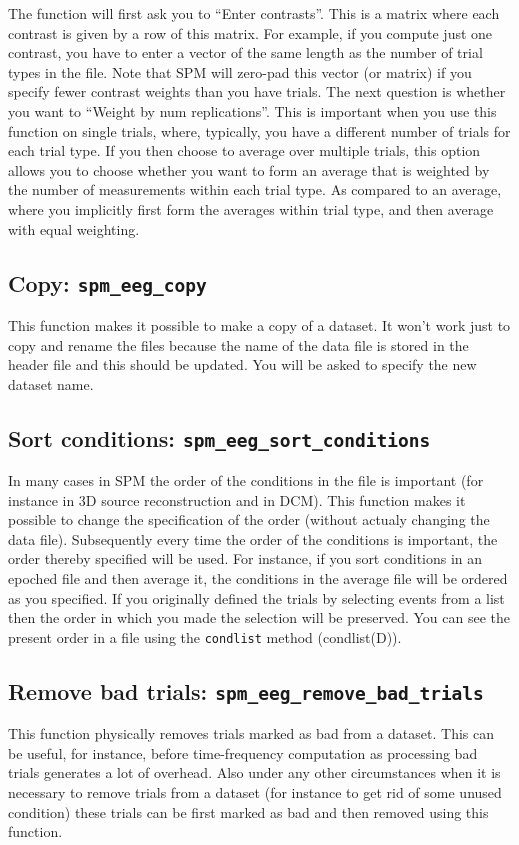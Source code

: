 The function will first ask you to ``Enter contrasts''. This is a matrix where each contrast is given by a row of this matrix. For example, if you compute just one contrast, you have to enter a vector of the same length as the number of trial types in the file. Note that SPM will zero-pad this vector  (or matrix) if you specify fewer contrast weights than you have trials.  The next question is whether you want to ``Weight by num replications''. This is important when you use this function on single trials, where, typically, you have a different number of trials for each trial type. If you then choose to average over multiple trials, this option allows you to choose whether you want to form an average that is weighted by the number of measurements within each trial type. As compared to an average, where you implicitly first form the averages within trial type, and then average with equal weighting.

\subsection{Copy: \texttt{spm\_eeg\_copy}}
This function makes it possible to make a copy of a dataset. It won't work just to copy and rename the files because the name of the data file is stored in the header file and this should be updated. You will be asked to specify the new dataset name.

\subsection{Sort conditions: \texttt{spm\_eeg\_sort\_conditions}}
In many cases in SPM the order of the conditions in the file is important (for instance in 3D source reconstruction and in DCM). This function makes it possible to change the specification of the order (without actualy changing the data file). Subsequently every time the order of the conditions is important, the order thereby specified will be used. For instance, if you sort conditions in an epoched file and then average it, the conditions in the average file will be ordered as you specified. If you originally defined the trials by selecting events from a list then the order in which you made the selection will be preserved. You can see the present order in a file using the \texttt{condlist} method (condlist(D)).

\subsection{Remove bad trials: \texttt{spm\_eeg\_remove\_bad\_trials}}
This function physically removes trials marked as bad from a dataset. This can be useful, for instance, before time-frequency computation as processing bad trials generates a lot of overhead. Also under any other circumstances when it is necessary to remove trials from a dataset (for instance to get rid of some unused condition) these trials can be first marked as bad and then removed using this function.

